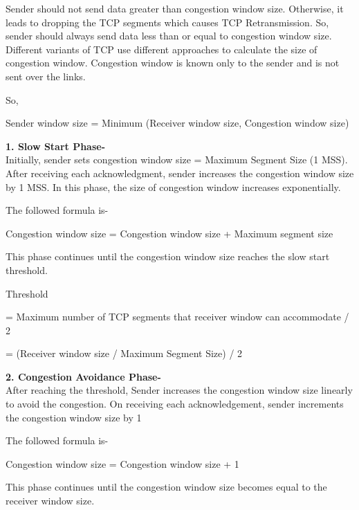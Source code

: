 \documentclass[11pt]{article}
\begin{document}
Sender should not send data greater than congestion window size. Otherwise, it leads to dropping the TCP segments which causes TCP Retransmission. So, sender should always send data less than or equal to congestion window size.
Different variants of TCP use different approaches to calculate the size of congestion window. Congestion window is known only to the sender and is not sent over the links.

So, 
\begin{center}
    Sender window size = Minimum (Receiver window size, Congestion window size)
\end{center}


\textbf{1. Slow Start Phase-}\\[12pt]

Initially, sender sets congestion window size = Maximum Segment Size (1 MSS). After receiving each acknowledgment, sender increases the congestion window size by 1 MSS. In this phase, the size of congestion window increases exponentially.

The followed formula is-

\begin{center}
    Congestion window size = Congestion window size + Maximum segment size
\end{center}

This phase continues until the congestion window size reaches the slow start threshold.

\begin{center}
   Threshold

= Maximum number of TCP segments that receiver window can accommodate / 2

= (Receiver window size / Maximum Segment Size) / 2
\end{center}


\textbf{2. Congestion Avoidance Phase-}\\[12pt]

After reaching the threshold, Sender increases the congestion window size linearly to avoid the congestion. On receiving each acknowledgement, sender increments the congestion window size by 1

The followed formula is-

\begin{center}
   Congestion window size = Congestion window size + 1
\end{center}

This phase continues until the congestion window size becomes equal to the receiver window size.
\end{document}

